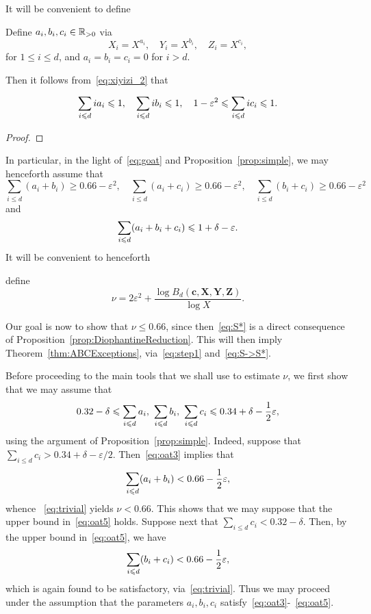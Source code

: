 It will be convenient to define
\begin{definition} \label{def:ai}
Define $a_i,b_i,c_i\in \mathbb{R}_{>0}$ via
\[
X_i=X^{a_i}, \quad Y_i=X^{b_i}, \quad Z_i=X^{c_i},
\]
for $1\leq i\leq d$, and $a_i=b_i=c_i=0$ for $i>d$.
\end{definition}
 Then it follows from~\eqref{eq:xiyizi_2} that
\begin{lemma}\label{lem:aiconstraints}
\begin{equation}\label{eq:oat1}
\sum_{i\leqslant d} ia_i \leqslant 1, \quad \sum_{i\leqslant d} ib_i \leqslant 1, \quad 1-\varepsilon^2\leqslant \sum_{i\leqslant d} ic_i \leqslant 1.
\end{equation}
\end{lemma}
\begin{proof}
\end{proof}
In particular, in the light of~\eqref{eq:goat} and
 Proposition~\ref{prop:simple}, we
may henceforth assume that
\begin{equation}\label{eq:oat4}
\sum_{i\leq d} (a_i+b_i)\geq 0.66-\varepsilon^2,\quad \sum_{i\leq d} (a_i+c_i)\geq 0.66-\varepsilon^2,\quad
\sum_{i\leq d} (b_i+c_i) \geq 0.66-\varepsilon^2
\end{equation}
and
\begin{equation}\label{eq:oat3}
\sum_{i\leqslant d} (a_i+b_i+c_i) \leqslant 1+\delta-\varepsilon.
\end{equation}
It will be convenient to henceforth
\begin{definition}\label{def:nu}
define
\[
\nu=2\varepsilon^2+\frac{\log B_d(\mathbf{c},\mathbf{X},\mathbf{Y},\mathbf{Z})}{\log X}.
\]
\end{definition}
Our goal is now to show that $\nu\le 0.66$, since then~\eqref{eq:S*}
is a direct consequence of
Proposition~\ref{prop:DiophantineReduction}.
This will then imply
Theorem~\ref{thm:ABCExceptions}, via~\eqref{eq:step1} and~\eqref{eq:S->S*}.


Before proceeding to the main tools that we shall use to estimate $\nu$, we first show that we may assume that \begin{equation}\label{eq:oat5}
0.32 - \delta \leqslant \sum_{i\leqslant d} a_i ,~ \sum_{i\leqslant d} b_i ,~ \sum_{i\leqslant d} c_i \leqslant 0.34 + \delta-
\frac{1}{2}\varepsilon,
\end{equation}
using the argument of Proposition~\ref{prop:simple}. Indeed, suppose that
$\sum_{i\leq d} c_i> 0.34 + \delta-\varepsilon/2$. Then~\eqref{eq:oat3} implies that
 \[
 \sum_{i\leqslant d} (a_i + b_i)<
 0.66-\frac{1}{2}\varepsilon,
 \]
 whence
~\eqref{eq:trivial} yields $\nu< 0.66$. This shows that we may suppose that the upper bound in~\eqref{eq:oat5} holds.
 Suppose next that
 $\sum_{i\leq d} c_i< 0.32 - \delta$. Then, by the upper bound in~\eqref{eq:oat5}, we have
 \[
 \sum_{i\leqslant d} (b_i + c_i)< 0.66-\frac{1}{2}\varepsilon,
 \]
which is again found to be satisfactory, via~\eqref{eq:trivial}. Thus we may proceed under the assumption that the parameters $a_i,b_i,c_i$ satisfy~\eqref{eq:oat3}-~\eqref{eq:oat5}.


